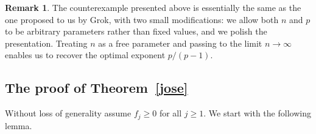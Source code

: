 \documentclass[11pt]{article}
\theoremstyle{definition}
\newtheorem{remark}[theorem]{Remark}
\newcommand{\1}{\mathbf{1}}
\begin{document}
\begin{remark}
The counterexample presented above is essentially the same as the one proposed to us by Grok, with two small modifications: we allow both  $n$ and $p$ to be arbitrary parameters rather than fixed values, and we polish the presentation. Treating $n$ as a free parameter and passing to the limit $n \to \infty$ enables us to recover the optimal exponent $p/(p-1)$.
\end{remark}



\subsection{The proof of Theorem~\ref{jose}}\label{jos01}
Without loss of generality assume $f_{j}\geq 0$ for all $j\geq 1$. We start with the following lemma. 
\end{document}
